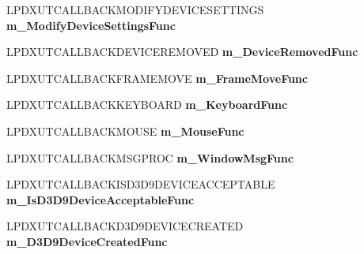 \begin{DoxyCompactItemize}
\item 
\hypertarget{struct_d_x_u_t_state_1_1_s_t_a_t_e_a721437e62eb11a7b5e2d193b50c5eee3}{L\+P\+D\+X\+U\+T\+C\+A\+L\+L\+B\+A\+C\+K\+M\+O\+D\+I\+F\+Y\+D\+E\+V\+I\+C\+E\+S\+E\+T\+T\+I\+N\+G\+S {\bfseries m\+\_\+\+Modify\+Device\+Settings\+Func}}\label{struct_d_x_u_t_state_1_1_s_t_a_t_e_a721437e62eb11a7b5e2d193b50c5eee3}

\item 
\hypertarget{struct_d_x_u_t_state_1_1_s_t_a_t_e_a7441aa3853df2709681a1027c1bdb226}{L\+P\+D\+X\+U\+T\+C\+A\+L\+L\+B\+A\+C\+K\+D\+E\+V\+I\+C\+E\+R\+E\+M\+O\+V\+E\+D {\bfseries m\+\_\+\+Device\+Removed\+Func}}\label{struct_d_x_u_t_state_1_1_s_t_a_t_e_a7441aa3853df2709681a1027c1bdb226}

\item 
\hypertarget{struct_d_x_u_t_state_1_1_s_t_a_t_e_a252a76131c7d17c44841faf8abca7691}{L\+P\+D\+X\+U\+T\+C\+A\+L\+L\+B\+A\+C\+K\+F\+R\+A\+M\+E\+M\+O\+V\+E {\bfseries m\+\_\+\+Frame\+Move\+Func}}\label{struct_d_x_u_t_state_1_1_s_t_a_t_e_a252a76131c7d17c44841faf8abca7691}

\item 
\hypertarget{struct_d_x_u_t_state_1_1_s_t_a_t_e_a734b59a8d704517fcea16ae79983151e}{L\+P\+D\+X\+U\+T\+C\+A\+L\+L\+B\+A\+C\+K\+K\+E\+Y\+B\+O\+A\+R\+D {\bfseries m\+\_\+\+Keyboard\+Func}}\label{struct_d_x_u_t_state_1_1_s_t_a_t_e_a734b59a8d704517fcea16ae79983151e}

\item 
\hypertarget{struct_d_x_u_t_state_1_1_s_t_a_t_e_a92ce70e6a56d51f8f281cb3d91ed150a}{L\+P\+D\+X\+U\+T\+C\+A\+L\+L\+B\+A\+C\+K\+M\+O\+U\+S\+E {\bfseries m\+\_\+\+Mouse\+Func}}\label{struct_d_x_u_t_state_1_1_s_t_a_t_e_a92ce70e6a56d51f8f281cb3d91ed150a}

\item 
\hypertarget{struct_d_x_u_t_state_1_1_s_t_a_t_e_ac46ec283780560f0b7689489cc04783b}{L\+P\+D\+X\+U\+T\+C\+A\+L\+L\+B\+A\+C\+K\+M\+S\+G\+P\+R\+O\+C {\bfseries m\+\_\+\+Window\+Msg\+Func}}\label{struct_d_x_u_t_state_1_1_s_t_a_t_e_ac46ec283780560f0b7689489cc04783b}

\item 
\hypertarget{struct_d_x_u_t_state_1_1_s_t_a_t_e_a5a68d7fff5899c350578d88293c57c58}{L\+P\+D\+X\+U\+T\+C\+A\+L\+L\+B\+A\+C\+K\+I\+S\+D3\+D9\+D\+E\+V\+I\+C\+E\+A\+C\+C\+E\+P\+T\+A\+B\+L\+E {\bfseries m\+\_\+\+Is\+D3\+D9\+Device\+Acceptable\+Func}}\label{struct_d_x_u_t_state_1_1_s_t_a_t_e_a5a68d7fff5899c350578d88293c57c58}

\item 
\hypertarget{struct_d_x_u_t_state_1_1_s_t_a_t_e_a11066ce07c5421d1e06519a2a5ab13dd}{L\+P\+D\+X\+U\+T\+C\+A\+L\+L\+B\+A\+C\+K\+D3\+D9\+D\+E\+V\+I\+C\+E\+C\+R\+E\+A\+T\+E\+D {\bfseries m\+\_\+\+D3\+D9\+Device\+Created\+Func}}\label{struct_d_x_u_t_state_1_1_s_t_a_t_e_a11066ce07c5421d1e06519a2a5ab13dd}


\end{DoxyCompactItemize}
